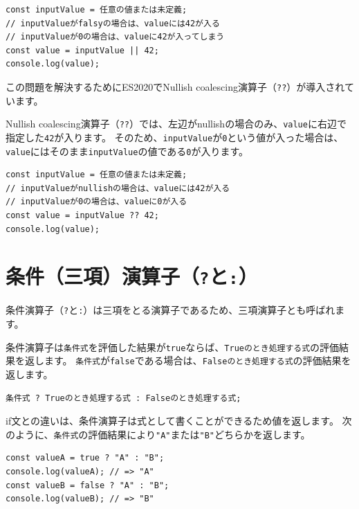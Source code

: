 \begin{lstlisting}
const inputValue = 任意の値または未定義;
// inputValueがfalsyの場合は、valueには42が入る
// inputValueが0の場合は、valueに42が入ってしまう
const value = inputValue || 42;
console.log(value);
\end{lstlisting}

この問題を解決するためにES2020でNullish coalescing演算子（\texttt{??}）が導入されています。

Nullish coalescing演算子（\texttt{??}）では、左辺がnullishの場合のみ、\texttt{value}に右辺で指定した\texttt{42}が入ります。
そのため、\texttt{inputValue}が\texttt{0}という値が入った場合は、\texttt{value}にはそのまま\texttt{inputValue}の値である\texttt{0}が入ります。

\begin{lstlisting}
const inputValue = 任意の値または未定義;
// inputValueがnullishの場合は、valueには42が入る
// inputValueが0の場合は、valueに0が入る
const value = inputValue ?? 42;
console.log(value);
\end{lstlisting}

\hypertarget{ternary-operator}{%
\section{\texorpdfstring{条件（三項）演算子（\texttt{?}と\texttt{:}）}{条件（三項）演算子（?と:）}}\label{ternary-operator}}

条件演算子（\texttt{?}と\texttt{:}）は三項をとる演算子であるため、三項演算子とも呼ばれます。

条件演算子は\texttt{条件式}を評価した結果が\texttt{true}ならば、\texttt{Trueのとき処理する式}の評価結果を返します。
\texttt{条件式}が\texttt{false}である場合は、\texttt{Falseのとき処理する式}の評価結果を返します。

\begin{lstlisting}
条件式 ? Trueのとき処理する式 : Falseのとき処理する式;
\end{lstlisting}

if文との違いは、条件演算子は式として書くことができるため値を返します。
次のように、\texttt{条件式}の評価結果により\texttt{"A"}または\texttt{"B"}どちらかを返します。

\begin{lstlisting}
const valueA = true ? "A" : "B";
console.log(valueA); // => "A"
const valueB = false ? "A" : "B";
console.log(valueB); // => "B"
\end{lstlisting}

